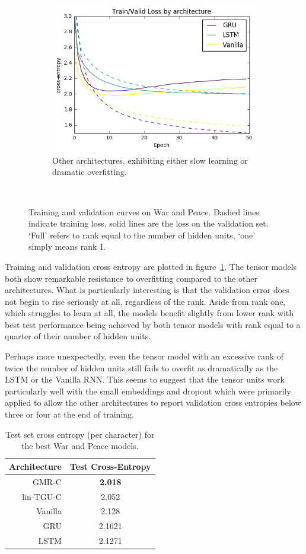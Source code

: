 \begin{figure}
\begin{subfigure}[t]{0.3\textwidth}
	\includegraphics[width=\textwidth]{exps/wp/others}
	\caption{Other architectures, exhibiting either slow learning or dramatic overfitting.}
\end{subfigure}~
\caption{Training and validation curves on War and Peace. 
		 Dashed lines indicate training loss, solid lines are the loss on the validation set.
		 `Full' refers to rank equal to the number of hidden units, `one' simply means rank 1.}
\label{fig:wp}
\end{figure}

Training and validation cross entropy are plotted in figure~\ref{fig:wp}. 
The tensor models both
show remarkable resistance to overfitting compared to the other architectures. What is particularly
interesting is that the validation error does not begin to rise seriously at all, regardless of the
rank. Aside from rank one, which struggles to learn at all, the models benefit slightly from lower
rank with best test performance being achieved by both tensor models with rank equal to a quarter
of their number of hidden units.

Perhaps more unexpectedly, even the tensor model with an excessive rank of twice the number of hidden
units still fails to overfit as dramatically as the LSTM or the Vanilla RNN. This seems to suggest that
the tensor units work particularly well with the small embeddings and dropout which were primarily
applied to allow the other architectures to report validation cross entropies below three or four
at the end of training.

\begin{table}
\begin{tabu} to \textwidth {r||c}
Architecture & Test Cross-Entropy \\
\hline
GMR-C & \textbf{2.018} \\ %
lin-TGU-C & 2.052 \\ %
\hline
Vanilla & 2.128 \\ %
GRU & 2.1621 \\ %
LSTM & 2.1271 \\%
\hline
\end{tabu}
\caption{Test set cross entropy (per character) for the best War and Peace models.}
\label{tab:wptest}
\end{table}
